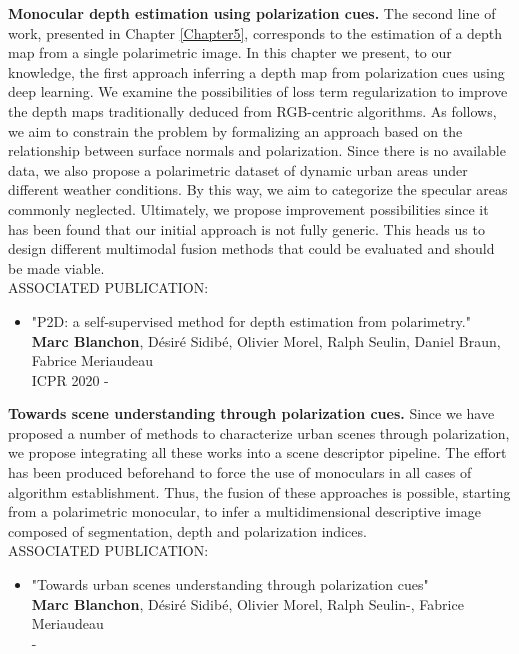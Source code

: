 \vspace*{8mm}
\textbf{Monocular depth estimation using polarization cues. }The second line of work, presented in Chapter \ref{Chapter5}, corresponds to the estimation of a depth map from a single polarimetric image. In this chapter we present, to our knowledge, the first approach inferring a depth map from polarization cues using deep learning.
We examine the possibilities of loss term regularization to improve the depth maps traditionally deduced from RGB-centric algorithms. As follows, we aim to constrain the problem by formalizing an approach based on the relationship between surface normals and polarization. Since there is no available data, we also propose a polarimetric dataset of dynamic urban areas under different weather conditions. By this way, we aim to categorize the specular areas commonly neglected. 
Ultimately, we propose improvement possibilities since it has been found that our initial approach is not fully generic. This heads us to design different multimodal fusion methods that could be evaluated and should be made viable. \\

\vspace*{8mm}
\hspace*{10mm} ASSOCIATED PUBLICATION:
\begin{itemize}
	\item "P2D: a self-supervised method for depth estimation from polarimetry."\\
	\textbf{Marc Blanchon}, D{\'e}sir{\'e} Sidib{\'e}, Olivier Morel, Ralph Seulin, Daniel Braun, Fabrice Meriaudeau\\
	ICPR 2020 - \cite{blanchon2021p2d}
\end{itemize}
\pagebreak
\vspace*{8mm}
\textbf{Towards scene understanding through polarization cues. }Since we have proposed a number of methods to characterize urban scenes through polarization, we propose integrating all these works into a scene descriptor pipeline. The effort has been produced beforehand to force the use of monoculars in all cases of algorithm establishment. Thus, the fusion of these approaches is possible, starting from a polarimetric monocular, to infer a multidimensional descriptive image composed of segmentation, depth and polarization indices.\\

\vspace*{8mm}
\hspace*{10mm} ASSOCIATED PUBLICATION:
\begin{itemize}
	\item "Towards urban scenes understanding through polarization cues"\\
	\textbf{Marc Blanchon}, D{\'e}sir{\'e} Sidib{\'e}, Olivier Morel, Ralph Seulin-, Fabrice Meriaudeau\\
	-
\end{itemize}
